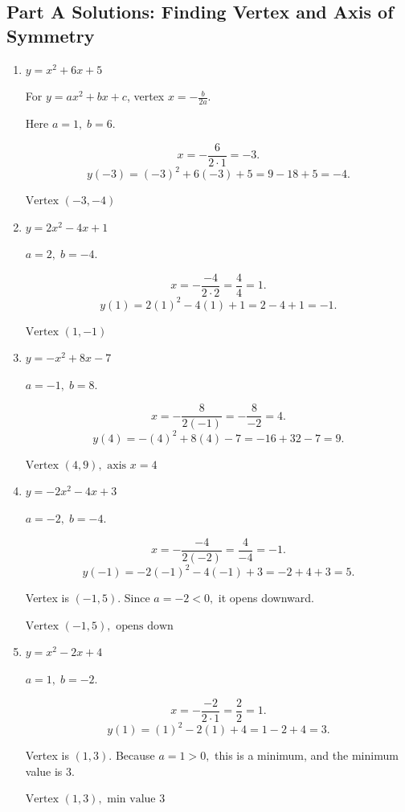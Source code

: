 \documentclass[14pt]{extarticle}
\begin{document}
\subsection*{Part A Solutions: Finding Vertex and Axis of Symmetry}
\begin{enumerate}
  \item \(y = x^2 + 6x + 5\)

  For \(y = ax^2 + bx + c\), vertex \(x = -\frac{b}{2a}.\)

  Here \(a = 1,\; b = 6.\)

  \[
  x = -\frac{6}{2 \cdot 1} = -3.
  \]
  \[
  y(-3) = (-3)^2 + 6(-3) + 5 = 9 - 18 + 5 = -4.
  \]

  \(\boxed{\text{Vertex } (-3, -4)}\)

  \item \(y = 2x^2 - 4x + 1\)

  \(a = 2,\; b = -4.\)

  \[
  x = -\frac{-4}{2 \cdot 2} = \frac{4}{4} = 1.
  \]
  \[
  y(1) = 2(1)^2 - 4(1) + 1 = 2 - 4 + 1 = -1.
  \]

  \(\boxed{\text{Vertex } (1, -1)}\)

  \item \(y = -x^2 + 8x - 7\)

  \(a = -1,\; b = 8.\)

  \[
  x = -\frac{8}{2(-1)} = -\frac{8}{-2} = 4.
  \]
  \[
  y(4) = -(4)^2 + 8(4) - 7 = -16 + 32 - 7 = 9.
  \]

  \(\boxed{\text{Vertex } (4, 9), \text{ axis } x = 4}\)

  \item \(y = -2x^2 - 4x + 3\)

  \(a = -2,\; b = -4.\)

  \[
  x = -\frac{-4}{2(-2)} = \frac{4}{-4} = -1.
  \]
  \[
  y(-1) = -2(-1)^2 - 4(-1) + 3 = -2 + 4 + 3 = 5.
  \]

  Vertex is \((-1, 5)\). Since \(a = -2 < 0,\) it opens downward.

  \(\boxed{\text{Vertex } (-1, 5), \text{ opens down}}\)

  \item \(y = x^2 - 2x + 4\)

  \(a = 1,\; b = -2.\)

  \[
  x = -\frac{-2}{2 \cdot 1} = \frac{2}{2} = 1.
  \]
  \[
  y(1) = (1)^2 - 2(1) + 4 = 1 - 2 + 4 = 3.
  \]

  Vertex is \((1, 3).\) Because \(a = 1 > 0,\) this is a minimum, and the minimum value is 3.

  \(\boxed{\text{Vertex } (1, 3), \text{ min value } 3}\)
\end{enumerate}
\end{document}

